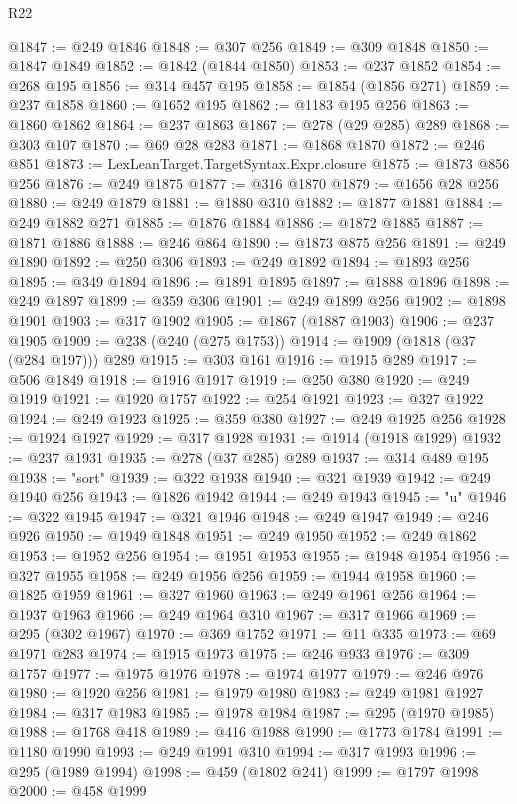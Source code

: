 \begin{lexlean}{R22}
\begin{coremodule}
@1847 := @249 @1846
@1848 := @307 @256
@1849 := @309 @1848
@1850 := @1847 @1849
@1852 := @1842 (@1844 @1850)
@1853 := @237 @1852
@1854 := @268 @195
@1856 := @314 @457 @195
@1858 := @1854 (@1856 @271)
@1859 := @237 @1858
@1860 := @1652 @195
@1862 := @1183 @195 @256
@1863 := @1860 @1862
@1864 := @237 @1863
@1867 := @278 (@29 @285) @289
@1868 := @303 @107
@1870 := @69 @28 @283
@1871 := @1868 @1870
@1872 := @246 @851
@1873 := LexLeanTarget.TargetSyntax.Expr.closure
@1875 := @1873 @856 @256
@1876 := @249 @1875
@1877 := @316 @1870
@1879 := @1656 @28 @256
@1880 := @249 @1879
@1881 := @1880 @310
@1882 := @1877 @1881
@1884 := @249 @1882 @271
@1885 := @1876 @1884
@1886 := @1872 @1885
@1887 := @1871 @1886
@1888 := @246 @864
@1890 := @1873 @875 @256
@1891 := @249 @1890
@1892 := @250 @306
@1893 := @249 @1892
@1894 := @1893 @256
@1895 := @349 @1894
@1896 := @1891 @1895
@1897 := @1888 @1896
@1898 := @249 @1897
@1899 := @359 @306
@1901 := @249 @1899 @256
@1902 := @1898 @1901
@1903 := @317 @1902
@1905 := @1867 (@1887 @1903)
@1906 := @237 @1905
@1909 := @238 (@240 (@275 @1753))
@1914 := @1909 (@1818 (@37 (@284 @197))) @289
@1915 := @303 @161
@1916 := @1915 @289
@1917 := @506 @1849
@1918 := @1916 @1917
@1919 := @250 @380
@1920 := @249 @1919
@1921 := @1920 @1757
@1922 := @254 @1921
@1923 := @327 @1922
@1924 := @249 @1923
@1925 := @359 @380
@1927 := @249 @1925 @256
@1928 := @1924 @1927
@1929 := @317 @1928
@1931 := @1914 (@1918 @1929)
@1932 := @237 @1931
@1935 := @278 (@37 @285) @289
@1937 := @314 @489 @195
@1938 := "sort"
@1939 := @322 @1938
@1940 := @321 @1939
@1942 := @249 @1940 @256
@1943 := @1826 @1942
@1944 := @249 @1943
@1945 := "u"
@1946 := @322 @1945
@1947 := @321 @1946
@1948 := @249 @1947
@1949 := @246 @926
@1950 := @1949 @1848
@1951 := @249 @1950
@1952 := @249 @1862
@1953 := @1952 @256
@1954 := @1951 @1953
@1955 := @1948 @1954
@1956 := @327 @1955
@1958 := @249 @1956 @256
@1959 := @1944 @1958
@1960 := @1825 @1959
@1961 := @327 @1960
@1963 := @249 @1961 @256
@1964 := @1937 @1963
@1966 := @249 @1964 @310
@1967 := @317 @1966
@1969 := @295 (@302 @1967)
@1970 := @369 @1752
@1971 := @11 @335
@1973 := @69 @1971 @283
@1974 := @1915 @1973
@1975 := @246 @933
@1976 := @309 @1757
@1977 := @1975 @1976
@1978 := @1974 @1977
@1979 := @246 @976
@1980 := @1920 @256
@1981 := @1979 @1980
@1983 := @249 @1981 @1927
@1984 := @317 @1983
@1985 := @1978 @1984
@1987 := @295 (@1970 @1985)
@1988 := @1768 @418
@1989 := @416 @1988
@1990 := @1773 @1784
@1991 := @1180 @1990
@1993 := @249 @1991 @310
@1994 := @317 @1993
@1996 := @295 (@1989 @1994)
@1998 := @459 (@1802 @241)
@1999 := @1797 @1998
@2000 := @458 @1999

\end{coremodule}
\end{lexlean}

